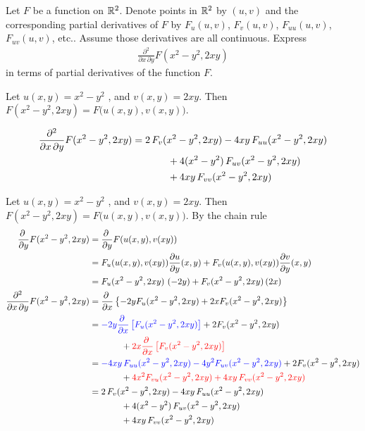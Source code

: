 \begin{question}[M200 2007A] %
Let $F$ be a function on $\mathbb{R}^2$. Denote points in $\mathbb{R}^2$ by $(u, v)$ 
and the corresponding partial derivatives of $F$ by $F_u(u, v)$, 
$F_v (u, v)$, $F_{uu}(u, v)$, $F_{uv}(u, v)$, etc.. 
Assume those derivatives are all continuous. Express
\begin{align*}
\frac{\partial^2}{\partial x\, \partial y} F(x^2 - y^2 , 2xy)
\end{align*}
in terms of partial derivatives of the function $F$.
\end{question}

\begin{hint}
Let $u(x,y) = x^2 - y^2$ , and $v(x,y) = 2xy$. Then $F(x^2 - y^2 , 2xy)
=F\big(u(x,y),v(x,y)\big)$.
\end{hint}

\begin{answer}
\begin{align*}
\frac{\partial^2}{\partial x\, \partial y} F(x^2 - y^2 , 2xy)
&= 2\,  F_v(x^2 - y^2 , 2xy) -4xy\, F_{uu}(x^2 - y^2 , 2xy) \\&\hskip0.5in
  +4(x^2-y^2)\, F_{uv}(x^2 - y^2 , 2xy) \\&\hskip0.5in
  +4xy\,  F_{vv}(x^2 - y^2 , 2xy)
\end{align*}
\end{answer}

\begin{solution}
Let $u(x,y) = x^2 - y^2$ , and $v(x,y) = 2xy$. Then 
$F(x^2 - y^2 , 2xy) =F\big(u(x,y),v(x,y)\big)$.
By the chain rule
\begin{align*}
\pdiff{}{y}F(x^2 - y^2 , 2xy)
&=\pdiff{}{y}F(u(x,y) , v(xy)) \\
&=F_u(u(x,y) , v(xy))\pdiff{u}{y}(x,y) +
          F_v(u(x,y) , v(xy))\pdiff{v}{y}(x,y) \\
&=  F_u(x^2 - y^2 , 2xy)\ (-2y) + F_v(x^2 - y^2 , 2xy)\, (2x) \\
\frac{\partial^2}{\partial x\, \partial y} F(x^2 - y^2 , 2xy)
&=\pdiff{}{x}\left\{-2y F_u(x^2 - y^2 , 2xy)
                    + 2x  F_v(x^2 - y^2 , 2xy)
             \right\} \\
&=\textcolor{blue}{-2y\pdiff{}{x}\left[ F_u(x^2 - y^2 , 2xy)\right]}
   +2 F_v(x^2 - y^2 , 2xy) \\&\hskip0.5in
   +\textcolor{red}{2x \pdiff{}{x}\left[F_v(x^2 - y^2 , 2xy)\right]} \\
&= \textcolor{blue}{-4xy\,F_{uu}(x^2 - y^2 , 2xy) -4y^2 F_{uv}(x^2 - y^2 , 2xy)}
  +2  F_v(x^2 - y^2 , 2xy) \\&\hskip0.5in
 + \textcolor{red}{4x^2  F_{vu}(x^2 - y^2 , 2xy)  
   +4xy\,F_{vv}(x^2 - y^2 , 2xy)} \\
&= 2 \, F_v(x^2 - y^2 , 2xy) -4xy\, F_{uu}(x^2 - y^2 , 2xy) \\&\hskip0.5in
  +4(x^2-y^2)\, F_{uv}(x^2 - y^2 , 2xy) \\&\hskip0.5in
  +4xy\,  F_{vv}(x^2 - y^2 , 2xy)
\end{align*}
\end{solution}


